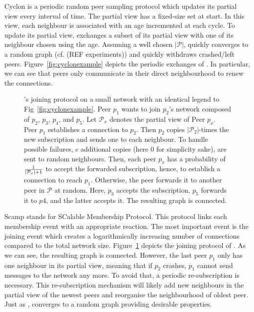 \begin{asparadesc}
\item [Cyclon]\cite{voulgaris2005cyclon} is a periodic random peer sampling
  protocol which updates its partial view every interval of time. The partial
  view has a fixed-size set at start. In this view, each neighbour is
  associated with an age incremented at each cycle. To update its partial view,
  \CYCLON{} exchanges a subset of its partial view with one of its neighbour
  chosen using the age.  Assuming a well chosen $|\mathcal{P}|$, \CYCLON{}
  quickly converges to a random graph (cf. (REF experiments)) and quickly
  withdraws crashed/left peers.  Figure~\ref{fig:cyclonexample} depicts the
  periodic exchanges of \CYCLON{}. In particular, we can see that peers only
  communicate in their direct neighbourhood to renew the connections.
\end{asparadesc}

\begin{figure}
  \centering
  
  \caption{\label{fig:scampexample} \SCAMP{}'s joining protocol on a small
    network with an identical legend to Fig~\ref{fig:cyclonexample}. Peer $p_1$
    wants to join $p_2$'s network composed of $p_2$, $p_3$, $p_4$, and
    $p_5$. Let $\mathcal{P}_x$ denotes the partial view of Peer $p_x$. Peer
    $p_1$ establishes a connection to $p_2$. Then $p_2$ copies
    $|\mathcal{P}_2|$-times the new subscription and sends one to each
    neighbour. To handle possible failures, $c$ additional copies (here $0$ for
    simplicity sake), are sent to random neighbours. Then, each peer $p_x$ has
    a probability of $1\over{|\mathcal{P}_x|+1}$ to accept the forwarded
    subscription, hence, to establish a connection to reach $p_1$. Otherwise,
    the peer forwards it to another peer in $\mathcal{P}$ at random. Here,
    $p_3$ accepts the subscription, $p_5$ forwards it to $p4$, and the latter
    accepts it. The resulting graph is connected.}
\end{figure}

\begin{asparadesc}
\item [Scamp]\cite{ganesh2001scamp,ganesh2003peer} stands for SCalable
  Membership Protocol. This protocol links each membership event with an
  appropriate reaction.  The most important event is the joining event which
  creates a logarithmically increasing number of connections compared to the
  total network size.  Figure~\ref{fig:scampexample} depicts the joining
  protocol of \SCAMP{}. As we can see, the resulting graph is
  connected. However, the last peer $p_1$ only has one neighbour in its partial
  view, meaning that if $p_2$ crashes, $p_1$ cannot send messages to the
  network any more. To avoid that, a periodic re-subscription is
  necessary. This re-subscription mechanism will likely add new neighbours in
  the partial view of the newest peers and reorganise the neighbourhood of
  oldest peer. Just as \CYCLON{}, \SCAMP{} converges to a random graph
  providing desirable properties.
\end{asparadesc}

